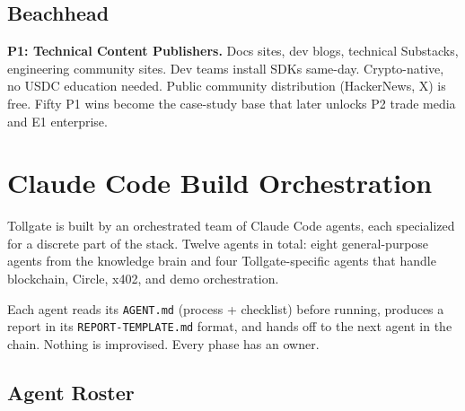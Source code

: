 \documentclass[11pt,a4paper]{article}
\newcommand{\iconGate}{\textcolor{tollgatepink}{\faDoorOpen}}
\newcommand{\iconCog}{\textcolor{tollgateslate}{\faCog}}
\begin{document}
\subsection{Beachhead}

\begin{archbox}[title={\iconGate~ Week-1 target after launch}]
\textbf{P1: Technical Content Publishers.} Docs sites, dev blogs, technical Substacks, engineering community sites. Dev teams install SDKs same-day. Crypto-native, no USDC education needed. Public community distribution (HackerNews, X) is free. Fifty P1 wins become the case-study base that later unlocks P2 trade media and E1 enterprise.
\end{archbox}

\newpage

\section{Claude Code Build Orchestration}

\begin{tollbox}[title={\iconCog~ Who codes Tollgate}]
Tollgate is built by an orchestrated team of Claude Code agents, each specialized for a discrete part of the stack. Twelve agents in total: eight general-purpose agents from the knowledge brain and four Tollgate-specific agents that handle blockchain, Circle, x402, and demo orchestration.

Each agent reads its \texttt{AGENT.md} (process + checklist) before running, produces a report in its \texttt{REPORT-TEMPLATE.md} format, and hands off to the next agent in the chain. Nothing is improvised. Every phase has an owner.
\end{tollbox}

\subsection{Agent Roster}
\end{document}
